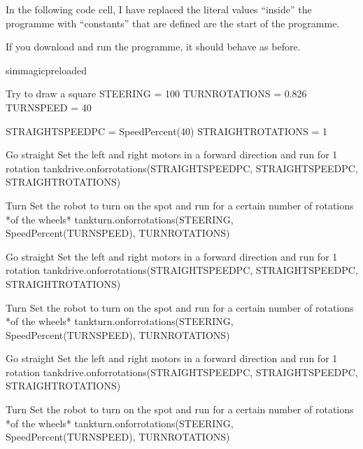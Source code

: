 \documentclass[letterpaper,10pt,english]{sphinxmanual}
\begin{document}
In the following code cell, I have replaced the literal values “inside” the programme with “constants” that are defined are the start of the programme.

If you download and run the programme, it should behave as before.

{
\begin{sphinxVerbatim}[commandchars=\\\{\}]
\llap{\color{nbsphinxin}[ ]:\,\hspace{\fboxrule}\hspace{\fboxsep}}\PYGZpc{}\PYGZpc{}sim\PYGZus{}magic\PYGZus{}preloaded

\PYGZsh{} Try to draw a square
STEERING = \PYGZhy{}100
TURN\PYGZus{}ROTATIONS = 0.826
TURN\PYGZus{}SPEED = 40

STRAIGHT\PYGZus{}SPEED\PYGZus{}PC = SpeedPercent(40)
STRAIGHT\PYGZus{}ROTATIONS = 1

\PYGZsh{}Go straight
\PYGZsh{} Set the left and right motors in a forward direction
\PYGZsh{} and run for 1 rotation
tank\PYGZus{}drive.on\PYGZus{}for\PYGZus{}rotations(STRAIGHT\PYGZus{}SPEED\PYGZus{}PC, STRAIGHT\PYGZus{}SPEED\PYGZus{}PC, STRAIGHT\PYGZus{}ROTATIONS)

\PYGZsh{}Turn
\PYGZsh{} Set the robot to turn on the spot
\PYGZsh{} and run for a certain number of rotations *of the wheels*
tank\PYGZus{}turn.on\PYGZus{}for\PYGZus{}rotations(STEERING, SpeedPercent(TURN\PYGZus{}SPEED), TURN\PYGZus{}ROTATIONS)

\PYGZsh{}Go straight
\PYGZsh{} Set the left and right motors in a forward direction
\PYGZsh{} and run for 1 rotation
tank\PYGZus{}drive.on\PYGZus{}for\PYGZus{}rotations(STRAIGHT\PYGZus{}SPEED\PYGZus{}PC, STRAIGHT\PYGZus{}SPEED\PYGZus{}PC, STRAIGHT\PYGZus{}ROTATIONS)

\PYGZsh{}Turn
\PYGZsh{} Set the robot to turn on the spot
\PYGZsh{} and run for a certain number of rotations *of the wheels*
tank\PYGZus{}turn.on\PYGZus{}for\PYGZus{}rotations(STEERING, SpeedPercent(TURN\PYGZus{}SPEED), TURN\PYGZus{}ROTATIONS)

\PYGZsh{}Go straight
\PYGZsh{} Set the left and right motors in a forward direction
\PYGZsh{} and run for 1 rotation
tank\PYGZus{}drive.on\PYGZus{}for\PYGZus{}rotations(STRAIGHT\PYGZus{}SPEED\PYGZus{}PC, STRAIGHT\PYGZus{}SPEED\PYGZus{}PC, STRAIGHT\PYGZus{}ROTATIONS)

\PYGZsh{}Turn
\PYGZsh{} Set the robot to turn on the spot
\PYGZsh{} and run for a certain number of rotations *of the wheels*
tank\PYGZus{}turn.on\PYGZus{}for\PYGZus{}rotations(STEERING, SpeedPercent(TURN\PYGZus{}SPEED), TURN\PYGZus{}ROTATIONS)


\end{sphinxVerbatim}}
\end{document}
